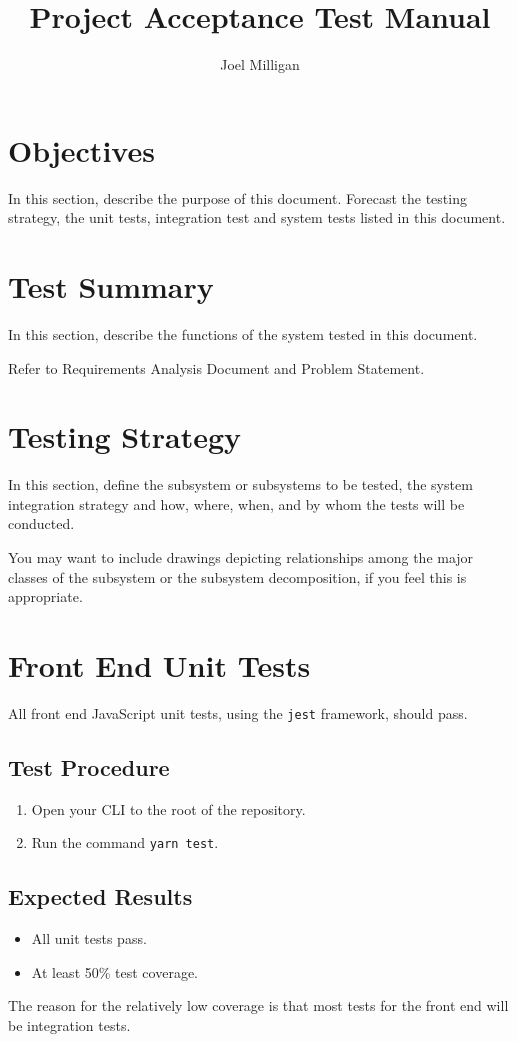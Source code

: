 \documentclass[a4paper, draft]{article}
\author{Joel Milligan}
\title{Project Acceptance Test Manual}
\date{}
\begin{document}
\maketitle
\tableofcontents

\newpage
\section{Objectives}
In this section, describe the purpose of this document.
Forecast the testing strategy, the unit tests, integration test and system tests listed in this document.

\section{Test Summary}
In this section, describe the functions of the system tested in this document.

Refer to Requirements Analysis Document and Problem Statement.

\section{Testing Strategy}
In this section, define the subsystem or subsystems to be tested, the system integration strategy and how, where, when, and by whom the tests will be conducted.

You may want to include drawings depicting relationships among the major classes of the subsystem or the subsystem decomposition, if you feel this is appropriate.

\newpage
\section{Front End Unit Tests}
All front end JavaScript unit tests, using the \texttt{jest} framework, should pass.

\subsection{Test Procedure}
\begin{enumerate}
    \item Open your CLI to the root of the repository.
    \item Run the command \texttt{yarn test}.
\end{enumerate}

\subsection{Expected Results}
\begin{itemize}
    \item All unit tests pass.
    \item At least 50\% test coverage.
\end{itemize}
The reason for the relatively low coverage is that most tests for the front end will be integration tests.
\end{document}
